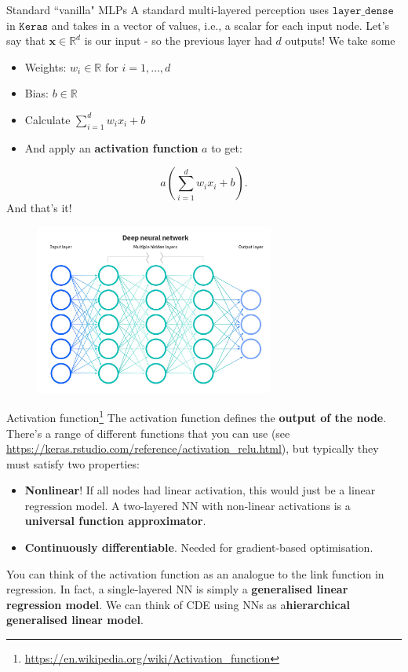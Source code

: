 \documentclass{beamer}
\begin{document}
\begin{frame}{Standard ``vanilla" MLPs}
A standard multi-layered perception uses $\texttt{layer\_dense}$ in $\texttt{Keras}$ and takes in a vector of values, i.e., a scalar for each input node. Let's say that $\mathbf{x}\in\mathbb{R}^d$ is our input - so the previous layer had $d$ outputs! We take some
\begin{itemize}
\item Weights: $w_i \in \mathbb{R}$ for $i=1,\dots,d$
\item Bias: $b\in\mathbb{R}$ 
\item Calculate $\sum^d_{i=1}w_ix_i + b$
\item And apply an \textbf{activation function} $a$ to get:
\end{itemize}
\[a\left(\sum^d_{i=1}w_ix_i + b\right).\]
And that's it!
\end{frame}
\begin{frame}
\begin{figure}
\includegraphics[width=0.7\textwidth]{Images/nn.jpg}
\end{figure}
\end{frame}
\begin{frame}{Activation function\footnote{\url{https://en.wikipedia.org/wiki/Activation_function}}}
The activation function defines the \textbf{output of the node}. There's a range of different functions that you can use (see \url{https://keras.rstudio.com/reference/activation_relu.html}), but typically they must satisfy two properties:  
\begin{itemize}
\item \textbf{Nonlinear}! If all nodes had linear activation, this would just be a linear regression model. A two-layered NN with non-linear activations is a \textbf{universal function approximator}.
\item \textbf{Continuously differentiable}. Needed for gradient-based optimisation.
\end{itemize}
You can think of the activation function as an analogue to the link function in regression. In fact, a single-layered NN is simply a \textbf{generalised linear regression model}. We can think of CDE using NNs as a\textbf{hierarchical generalised linear model}.
\end{frame}
\end{document}
